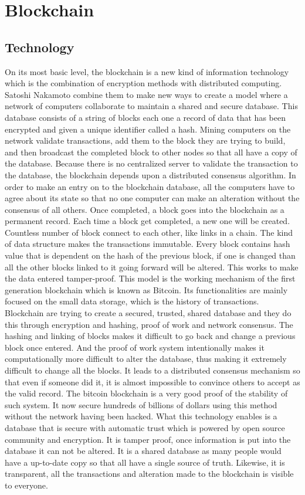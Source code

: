 \documentclass[openany,12pt]{ecsthesis}      %
\begin{document}
\section{Blockchain}
\subsection{Technology}
On its most basic level, 
the blockchain is a new kind of information technology 
which is the combination of encryption methods with distributed computing.
Satoshi Nakamoto \cite{nakamoto2008bitcoin} combine them to make new ways to create a model 
where a network of computers collaborate to maintain a shared and secure database. 
This database consists of a string of blocks each one a record of data 
that has been encrypted and given a unique identifier called a hash.
Mining computers on the network validate transactions, 
add them to the block they are trying to build, 
and then broadcast the completed block to other nodes 
so that all have a copy of the database. 
Because there is no centralized server to validate the transaction to the database,
the blockchain depends upon a distributed consensus algorithm. 
In order to make an entry on to the blockchain database, 
all the computers have to agree about its state 
so that no one computer can make an alteration without the consensus of all others.
Once completed, a block goes into the blockchain as a permanent record. Each time a block get completed, a new one will be created.
Countless number of block connect to each other, like links in a chain. The kind of data structure makes the transactions immutable.
Every block contains hash value that is dependent on the hash of the previous block, 
if one is changed than all the other blocks linked to it going forward will be altered.
This works to make the data entered tamper-proof. 
This model is the working mechanism of the first generation blockchain which is known as Bitcoin.
Its functionalities are mainly focused on the small data storage, which is the history of transactions.
Blockchain are trying to create a secured, trusted, 
shared database and they do this through encryption and hashing,
proof of work and network consensus. The hashing and linking of blocks 
makes it difficult to go back and change a previous block once entered. 
And the proof of work system intentionally makes it computationally more difficult to alter the database,
thus making it extremely difficult to change all the blocks. It leads to a distributed consensus mechanism so that even if someone did it,
it is almost impossible to convince others to accept as the valid record. The bitcoin blockchain is a very good proof of the stability of such system.
It now secure hundreds of billions of dollars using this method without the network having been hacked. 
What this technology enables is a database that is secure with automatic trust 
which is powered by open source community and encryption.
It is tamper proof, once information is put into the database it can not be altered. 
It is a shared database as many people would have a up-to-date copy so that all have a single source of truth.
Likewise, it is transparent, all the transactions and alteration made to the blockchain is visible to everyone.
\end{document}
